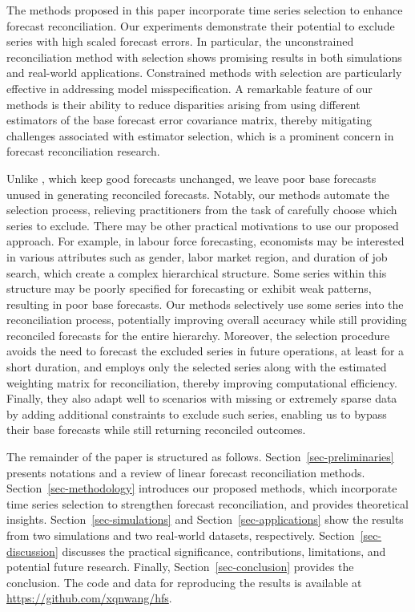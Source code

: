 \documentclass[
  11pt]{article}
\theoremstyle{plain}
\theoremstyle{remark}
\begin{document}
The methods proposed in this paper incorporate time series selection to
enhance forecast reconciliation. Our experiments demonstrate their
potential to exclude series with high scaled forecast errors. In
particular, the unconstrained reconciliation method with selection shows
promising results in both simulations and real-world applications.
Constrained methods with selection are particularly effective in
addressing model misspecification. A remarkable feature of our methods
is their ability to reduce disparities arising from using different
estimators of the base forecast error covariance matrix, thereby
mitigating challenges associated with estimator selection, which is a
prominent concern in forecast reconciliation research.

Unlike \citet{Zhang2023-op}, which keep good forecasts unchanged, we
leave poor base forecasts unused in generating reconciled forecasts.
Notably, our methods automate the selection process, relieving
practitioners from the task of carefully choose which series to exclude.
There may be other practical motivations to use our proposed approach.
For example, in labour force forecasting, economists may be interested
in various attributes such as gender, labor market region, and duration
of job search, which create a complex hierarchical structure. Some
series within this structure may be poorly specified for forecasting or
exhibit weak patterns, resulting in poor base forecasts. Our methods
selectively use some series into the reconciliation process, potentially
improving overall accuracy while still providing reconciled forecasts
for the entire hierarchy. Moreover, the selection procedure avoids the
need to forecast the excluded series in future operations, at least for
a short duration, and employs only the selected series along with the
estimated weighting matrix for reconciliation, thereby improving
computational efficiency. Finally, they also adapt well to scenarios
with missing or extremely sparse data by adding additional constraints
to exclude such series, enabling us to bypass their base forecasts while
still returning reconciled outcomes.

The remainder of the paper is structured as follows.
Section~\ref{sec-preliminaries} presents notations and a review of
linear forecast reconciliation methods. Section~\ref{sec-methodology}
introduces our proposed methods, which incorporate time series selection
to strengthen forecast reconciliation, and provides theoretical
insights. Section~\ref{sec-simulations} and
Section~\ref{sec-applications} show the results from two simulations and
two real-world datasets, respectively. Section~\ref{sec-discussion}
discusses the practical significance, contributions, limitations, and
potential future research. Finally, Section~\ref{sec-conclusion}
provides the conclusion. The code and data for reproducing the results
is available at \url{https://github.com/xqnwang/hfs}.
\end{document}
